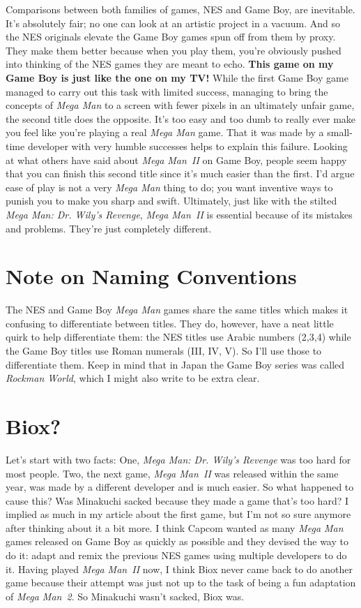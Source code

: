 \documentclass{book}
\begin{document}
Comparisons between both families of games, NES and Game Boy, are inevitable. It’s absolutely fair; no one can look at an artistic project in a vacuum. And so the NES originals elevate the Game Boy games spun off from them by proxy. They make them better because when you play them, you’re obviously pushed into thinking of the NES games they are meant to echo. \textbf{This game on my Game Boy is just like the one on my TV!} While the first Game Boy game managed to carry out this task with limited success, managing to bring the concepts of \emph{Mega Man} to a screen with fewer pixels in an ultimately unfair game, the second title does the opposite. It’s too easy and too dumb to really ever make you feel like you’re playing a real \emph{Mega Man} game. That it was made by a small-time developer with very humble successes helps to explain this failure. Looking at what others have said about \emph{Mega Man II} on Game Boy, people seem happy that you can finish this second title since it’s much easier than the first. I’d argue ease of play is not a very \emph{Mega Man} thing to do; you want inventive ways to punish you to make you sharp and swift. Ultimately, just like with the stilted \emph{Mega Man: Dr. Wily’s Revenge}, \emph{Mega Man II} is essential because of its mistakes and problems. They’re just completely different.

\FloatBarrier\needspace{10mm}\section*{Note on Naming Conventions}\nopagebreak[4]

The NES and Game Boy \emph{Mega Man} games share the same titles which makes it confusing to differentiate between titles. They do, however, have a neat little quirk to help differentiate them: the NES titles use Arabic numbers (2,3,4) while the Game Boy titles use Roman numerals (III, IV, V). So I’ll use those to differentiate them. Keep in mind that in Japan the Game Boy series was called \emph{Rockman World}, which I might also write to be extra clear.

\FloatBarrier\needspace{10mm}\section*{Biox?}\nopagebreak[4]

Let’s start with two facts: One, \emph{Mega Man: Dr. Wily’s Revenge} was too hard for most people. Two, the next game, \emph{Mega Man II} was released within the same year, was made by a different developer and is much easier. So what happened to cause this? Was Minakuchi sacked because they made a game that’s too hard? I implied as much in my article about the first game, but I’m not so sure anymore after thinking about it a bit more. I think Capcom wanted as many \emph{Mega Man} games released on Game Boy as quickly as possible and they devised the way to do it: adapt and remix the previous NES games using multiple developers to do it. Having played \emph{Mega Man II} now, I think Biox never came back to do another game because their attempt was just not up to the task of being a fun adaptation of \emph{Mega Man 2}. So Minakuchi wasn’t sacked, Biox was.
\end{document}
